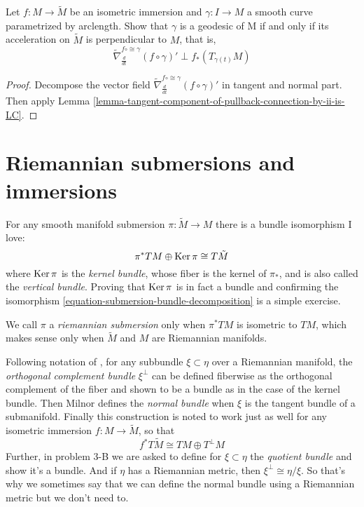 \begin{lemma}
\label{lemma-geodesics-of-submanifold-characterization}
Let $f:M \to \tilde{M}$ be an isometric immersion and $\gamma:I\to M$ a smooth
curve parametrized by arclength. Show that $\gamma$ is a geodesic of M
if and only if its acceleration on $\tilde{M}$ is perpendicular to $M$, that is,
$$
\tilde{\nabla}^{f\circ\cong\gamma}_{\frac{d}{dt}}(f\circ\gamma)'\perp
f_*(T_{\gamma(t)}M)
$$
\end{lemma}

\begin{proof}
Decompose the vector field 
$\tilde{\nabla}^{f\circ\cong\gamma}_{\frac{d}{dt}}(f\circ\gamma)'$ in tangent and
normal part. Then apply Lemma 
\ref{lemma-tangent-component-of-pullback-connection-by-ii-is-LC}.
\end{proof}

\section{Riemannian submersions and immersions}
\label{section-Riemannian-submersions-and-immersions}

For any smooth manifold submersion $\pi:\tilde{M}\to M$ there is a bundle
isomorphism I love: 
\begin{equation}
\label{equation-submersion-bundle-decomposition}
\pi^*TM \oplus \mathop{\mathrm{Ker}} \pi\cong
T\tilde{M} \end{equation}
 where $\mathop{\mathrm{Ker}}\pi$ is the {\it kernel bundle}, whose
fiber is the kernel of $\pi_*$, and is also called the {\it vertical bundle}.
Proving that $\mathop{\mathrm{Ker}}\pi$ is in fact a bundle and confirming the isomorphism
\ref{equation-submersion-bundle-decomposition} is a simple exercise.

We call $\pi$ a {\it riemannian submersion} only when $\pi^*TM$ is isometric to
$TM$, which makes sense only when $\tilde{M}$ and $M$ are Riemannian manifolds.

Following notation of \cite{Milnor-Characteristic-Classes}, for any subbundle
$\xi \subset\eta$ over a Riemannian manifold, the {\it orthogonal complement
bundle} $\xi^\perp$ can be defined fiberwise as the orthogonal complement of the
fiber and shown to be a bundle as in the case of the kernel bundle. Then Milnor
defines the {\it normal bundle} when $\xi$ is the tangent bundle of a
submanifold. Finally this construction is noted to work just as well for any
isometric immersion $f:M\to \tilde{M}$, so that
\begin{equation}
\label{equation-immersion-bundle-decomposition}
f^*T\tilde{M}\cong TM\oplus T^\perp M
\end{equation}
Further, in problem 3-B we are asked to define for $\xi \subset \eta$ the {\it
quotient bundle} and show it's a bundle. And if $\eta$ has a Riemannian metric,
then $\xi^\perp\cong\eta/\xi$. So that's why we sometimes say that we can define
the normal bundle using a Riemannian metric but we don't need to.

